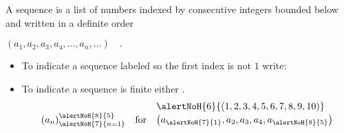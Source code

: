 \begin{frame}
\begin{definition}
A sequence is a list of numbers indexed by consecutive integers bounded below and written in a definite order

\hfil\hfil$\left( a_1, a_2, a_3, a_4, \ldots , a_n , \ldots \right) \quad .$
\end{definition}

\begin{itemize}
\item To indicate a sequence labeled so the first index is not $1$ write:
\item<5-> To indicate a sequence is finite either  .
\[
\begin{array}{rcl}
&& \alertNoH{6}{\left( 1,2,3,4,5,6,7,8,9,10 \right)} \\
\left(a_n\right)_{\alertNoH{7}{n=1} }^{ \alertNoH{8}{5}} & \text{for}& \left( a_{\alertNoH{7}{1}},a_2, a_3, a_4, a_{\alertNoH{8}{5}} \right)
\end{array}
\]
\end{itemize}

\vskip 5cm

\end{frame}
